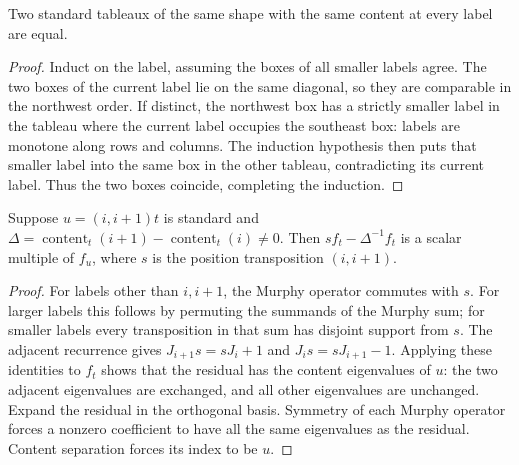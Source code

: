 \begin{lemma}
\label{lem:standard-content-separation}
\leanok
Two standard tableaux of the same shape with the same content at every
label are equal.
\end{lemma}
\begin{proof}
Induct on the label, assuming the boxes of all smaller labels agree.
The two boxes of the current label lie on the same diagonal, so they
are comparable in the northwest order. If distinct, the northwest box
has a strictly smaller label in the tableau where the current label
occupies the southeast box: labels are monotone along rows and columns.
The induction hypothesis then puts that smaller label into the same box
in the other tableau, contradicting its current label. Thus the two
boxes coincide, completing the induction.
\end{proof}

\begin{lemma}
\label{lem:adjacent-spectral-support}
\leanok
Suppose $u=(i,i+1)t$ is standard and
$\Delta=\operatorname{content}_t(i+1)-\operatorname{content}_t(i)\ne0$.
Then $s f_t-\Delta^{-1}f_t$ is a scalar multiple of $f_u$, where
$s$ is the position transposition $(i,i+1)$.
\end{lemma}
\begin{proof}
For labels other than $i,i+1$, the Murphy operator commutes with $s$.
For larger labels this follows by permuting the summands of the Murphy
sum; for smaller labels every transposition in that sum has disjoint
support from $s$. The adjacent recurrence gives
$J_{i+1}s=sJ_i+1$ and $J_i s=sJ_{i+1}-1$.
Applying these identities to $f_t$ shows that the residual has the
content eigenvalues of $u$: the two adjacent eigenvalues are exchanged,
and all other eigenvalues are unchanged.
Expand the residual in the orthogonal basis. Symmetry of each Murphy
operator forces a nonzero coefficient to have all the same eigenvalues
as the residual. Content separation forces its index to be $u$.
\end{proof}

